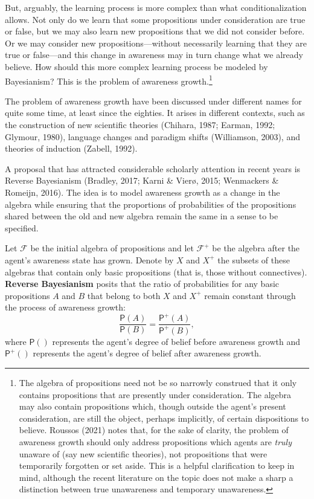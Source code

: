\documentclass[
  11pt,
  dvipsnames,enabledeprecatedfontcommands, todos]{scrartcl}
\newcommand{\pr}[1]{\ensuremath{\mathsf{P}(#1)}}
\newcommand{\ppr}[2]{\ensuremath{\mathsf{P}^{#1}(#2)}}
\begin{document}
But, arguably, the learning process is more complex than what
conditionalization allows. Not only do we learn that some propositions
under consideration are true or false, but we may also learn new
propositions that we did not consider before. Or we may consider new
propositions---without necessarily learning that they are true or
false---and this change in awareness may in turn change what we already
believe. How should this more complex learning process be modeled by
Bayesianism? This is the problem of awareness growth.\footnote{The
  algebra of propositions need not be so narrowly construed that it only
  contains propositions that are presently under consideration. The
  algebra may also contain propositions which, though outside the
  agent's present consideration, are still the object, perhaps
  implicitly, of certain dispositions to believe. Roussos (2021) notes
  that, for the sake of clarity, the problem of awareness growth should
  only address propositions which agents are \emph{truly} unaware of
  (say new scientific theories), not propositions that were temporarily
  forgotten or set aside. This is a helpful clarification to keep in
  mind, although the recent literature on the topic does not make a
  sharp a distinction between true unawareness and temporary
  unawareness.}

The problem of awareness growth have been discussed under different
names for quite some time, at least since the eighties. It arises in
different contexts, such as the construction of new scientific theories
(Chihara, 1987; Earman, 1992; Glymour, 1980), language changes and
paradigm shifts (Williamson, 2003), and theories of induction (Zabell,
1992).

A proposal that has attracted considerable scholarly attention in recent
years is Reverse Bayesianism (Bradley, 2017; Karni \& Vierø, 2015;
Wenmackers \& Romeijn, 2016). The idea is to model awareness growth as a
change in the algebra while ensuring that the proportions of
probabilities of the propositions shared between the old and new algebra
remain the same in a sense to be specified.

Let \(\mathcal{F}\) be the initial algebra of propositions and let
\(\mathcal{F}^+\) be the algebra after the agent's awareness state has
grown. Denote by \(X\) and \(X^+\) the subsets of these algebras that
contain only basic propositions (that is, those without connectives).
\textbf{Reverse Bayesianism} posits that the ratio of probabilities for
any basic propositions \(A\) and \(B\) that belong to both \(X\) and
\(X^+\) remain constant through the process of awareness growth:
\[\frac{\pr{A}}{\pr{B}} = \frac{\ppr{+}{A}}{\ppr{+}{B}},\] where
\(\pr{}\) represents the agent's degree of belief before awareness
growth and \(\ppr{+}{}\) represents the agent's degree of belief after
awareness growth.
\end{document}
